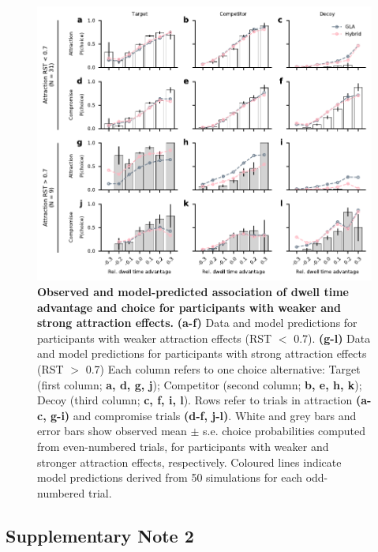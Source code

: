 \documentclass[11pt, a4paper]{article}
\begin{document}
\begin{refsection}
\begin{figure}[!ht]
\begin{centering}
\includegraphics[scale=1]{../figures/S_dwell-advantage_subgroups_gla-hybrid.pdf}
\caption{\textbf{Observed and model-predicted association of dwell time advantage and choice for participants with weaker and strong attraction effects.} \textbf{(a-f)} Data and model predictions for participants with weaker attraction effects (RST $<$ 0.7). \textbf{(g-l)} Data and model predictions for participants with strong attraction effects (RST $>$ 0.7) Each column refers to one choice alternative: Target (first column; \textbf{a, d, g, j}); Competitor (second column; \textbf{b, e, h, k}); Decoy (third column; \textbf{c, f, i, l}). Rows refer to trials in attraction \textbf{(a-c, g-i)} and compromise trials \textbf{(d-f, j-l)}. White and grey bars and error bars show observed mean $\pm$ s.e. choice probabilities computed from even-numbered trials, for participants with weaker and stronger attraction effects, respectively. Coloured lines indicate model predictions derived from 50 simulations for each odd-numbered trial.}
\label{fig:rdt-adv-subgroups}
\end{centering}
\end{figure}
\clearpage

\subsection*{Supplementary Note 2}
\label{sup:ade-choicerule}

\end{refsection}
\end{document}
